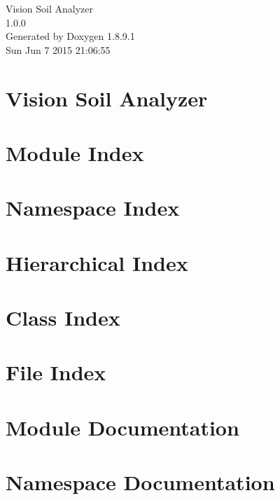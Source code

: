 \documentclass[twoside]{book}
\newcommand{\+}{\discretionary{\mbox{\scriptsize$\hookleftarrow$}}{}{}}
\newcommand{\clearemptydoublepage}{%
  \newpage{\pagestyle{empty}\cleardoublepage}%
}
\begin{document}
\hypersetup{pageanchor=false,
             bookmarks=true,
             bookmarksnumbered=true,
             pdfencoding=unicode
            }
\begin{titlepage}
\vspace*{7cm}
\begin{center}%
{\Large Vision Soil Analyzer \\[1ex]\large 1.\+0.\+0 }\\
\vspace*{1cm}
{\large Generated by Doxygen 1.8.9.1}\\
\vspace*{0.5cm}
{\small Sun Jun 7 2015 21:06:55}\\
\end{center}
\end{titlepage}
\clearemptydoublepage
\tableofcontents
\clearemptydoublepage
{}
\hypersetup{pageanchor=true}

\chapter{Vision Soil Analyzer}
\label{index}\hypertarget{index}{}
\chapter{Module Index}

\chapter{Namespace Index}

\chapter{Hierarchical Index}

\chapter{Class Index}

\chapter{File Index}

\chapter{Module Documentation}

\chapter{Namespace Documentation}












\end{document}
